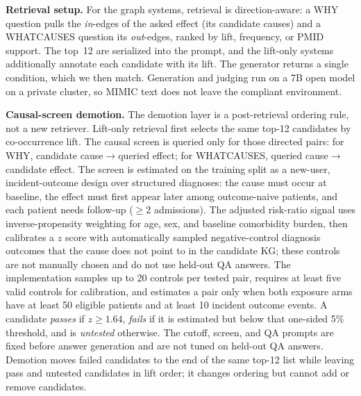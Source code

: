 \documentclass[runningheads]{llncs}
\begin{document}
\smallskip\noindent\textbf{Retrieval setup.}
For the graph systems, retrieval is direction-aware: a WHY question pulls the \emph{in}-edges of the asked effect (its candidate causes) and a WHATCAUSES question its \emph{out}-edges, ranked by lift, frequency, or PMID support. The top~12 are serialized into the prompt, and the lift-only systems additionally annotate each candidate with its lift. The generator returns a single condition, which we then match. Generation and judging run on a 7B open model on a private cluster, so MIMIC text does not leave the compliant environment.

\smallskip\noindent\textbf{Causal-screen demotion.} The demotion layer is a post-retrieval ordering rule, not a new retriever. Lift-only retrieval first selects the same top-12 candidates by co-occurrence lift. The causal screen is queried only for those directed pairs: for WHY, candidate cause$\rightarrow$queried effect; for WHATCAUSES, queried cause$\rightarrow$candidate effect. The screen is estimated on the training split as a new-user, incident-outcome design over structured diagnoses: the cause must occur at baseline, the effect must first appear later among outcome-naive patients, and each patient needs follow-up ($\geq$2 admissions). The adjusted risk-ratio signal uses inverse-propensity weighting for age, sex, and baseline comorbidity burden, then calibrates a $z$ score with automatically sampled negative-control diagnosis outcomes that the cause does not point to in the candidate KG; these controls are not manually chosen and do not use held-out QA answers. The implementation samples up to 20 controls per tested pair, requires at least five valid controls for calibration, and estimates a pair only when both exposure arms have at least 50 eligible patients and at least 10 incident outcome events. A candidate \emph{passes} if $z\geq1.64$, \emph{fails} if it is estimated but below that one-sided 5\% threshold, and is \emph{untested} otherwise. The cutoff, screen, and QA prompts are fixed before answer generation and are not tuned on held-out QA answers. Demotion moves failed candidates to the end of the same top-12 list while leaving pass and untested candidates in lift order; it changes ordering but cannot add or remove candidates.
\end{document}
